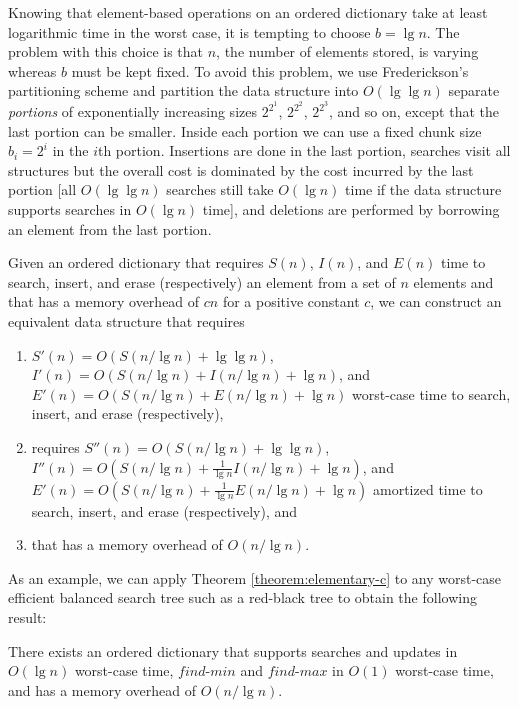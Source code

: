 \documentclass{DIKU-article}
\newcommand{\Findmin}{\mbox{$\mathit{find}$}\textnormal{-}\allowbreak{}\mbox{$\mathit{min}$}}
\newcommand{\Findmax}{\mbox{$\mathit{find}$}\textnormal{-}\allowbreak{}\mbox{$\mathit{max}$}}
\begin{document}
Knowing that element-based operations on an ordered dictionary take at
least logarithmic time in the worst case, it is tempting to choose $b
= \lg n$.  The problem with this choice is that $n$, the number of
elements stored, is varying whereas $b$ must be kept fixed. To avoid
this problem, we use Frederickson's partitioning scheme \cite{Fre83}
and partition the data structure into $O(\lg\lg n)$ separate
\emph{portions} of exponentially increasing sizes $2^{2^{1}}$,
$2^{2^{2}}$, $2^{2^{3}}$, and so on, except that the last portion can
be smaller.  Inside each portion we can use a fixed chunk size
$b_i=2^i$ in the $i$th portion. Insertions are done in the last
portion, searches visit all structures but the overall cost is
dominated by the cost incurred by the last portion [all $O(\lg\lg n)$
searches still take $O(\lg n)$ time if the data structure supports
searches in $O(\lg n)$ time], and deletions are performed by borrowing
an element from the last portion. 

\begin{theorem}
\label{theorem:elementary-c}
Given an ordered dictionary that requires $S(n)$, $I(n)$, and $E(n)$
time to search, insert, and erase (respectively) an element from a
set of $n$ elements and that has a memory overhead of $cn$ for a
positive constant $c$, we can construct an equivalent data structure
that requires 
\begin{enumerate}
\item $S'(n)=O(S(n/\lg n)+\lg\lg n)$, $I'(n)=O(S(n/\lg n)+I(n/\lg n)+\lg n)$,
and $E'(n)=O(S(n/\lg n)+E(n/\lg n)+\lg n)$ worst-case time to search, insert,
and erase (respectively), 
\item requires $S''(n)=O(S(n/\lg n)+\lg\lg n)$,
$I''(n)=O(S(n/\lg n)+\frac{1}{\lg n}I(n/\lg n)+\lg n)$, and
$E'(n)=O(S(n/\lg n)+\frac{1}{\lg n}E(n/\lg n)+\lg n)$ amortized time to search,
insert, and erase (respectively), and 
\item that has a memory overhead of
$O(n/\lg n)$.
\end{enumerate}
\end{theorem}

As an example, we can apply Theorem \ref{theorem:elementary-c} to any
worst-case efficient balanced search tree such as a red-black tree to
obtain the following result:

\begin{corollary}
\label{corollary:red-black}
There exists an ordered dictionary that supports searches and updates
in $O(\lg n)$ worst-case time, \Findmin{} and \Findmax{} in $O(1)$
worst-case time, and has a memory overhead of $O(n/\lg n)$.
\end{corollary}
\end{document}
